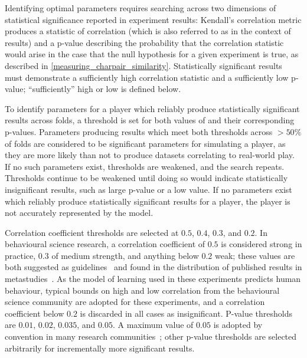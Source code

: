 Identifying optimal parameters requires searching across two dimensions of
statistical significance reported in experiment results: Kendall's \tau{}
correlation metric produces a statistic of correlation (which is also referred
to as \tau{} in the context of results) and a p-value describing the probability
that the correlation statistic would arise in the case that the null hypothesis
for a given experiment is true, as described in
\cref{measuring_charpair_similarity}. Statistically significant results must
demonstrate a sufficiently high correlation statistic and a sufficiently low
p-value; ``sufficiently'' high or low is defined below.

To identify parameters for a player which reliably produce statistically
significant results across folds, a threshold is set for both values of \tau{}
and their corresponding p-values. Parameters producing results which meet both
thresholds across $>50\%$ of folds are considered to be significant
parameters for simulating a player, as they are more likely than not to produce
datasets correlating to real-world play. If no such parameters exist,
thresholds are weakened, and the search repeats. Thresholds continue to be
weakened until doing so would indicate statistically insignificant results, such
as large p-value or a low \tau{} value. If no parameters exist which reliably
produce statistically significant results for a player, the player is not
accurately represented by the model.

\label{statistical_significance_thresholds_justified}
Correlation coefficient thresholds are selected at $0.5$, $0.4$, $0.3$, and
$0.2$. In behavioural science research, a correlation coefficient of $0.5$ is
considered strong in practice, $0.3$ of medium strength, and anything below
$0.2$ weak; these values are both suggested as
guidelines~\cite{significant_values_for_correlation_statistics} and found in the
distribution of published results in
metastudies~\cite{interpreting_correlation_coefficient_magnitude_psychology}. As
the model of learning used in these experiments predicts human behaviour,
typical bounds on high and low correlation from the behavioural science
community are adopted for these experiments, and a correlation coefficient below
$0.2$ is discarded in all cases as insignificant. P-value thresholds are $0.01$,
$0.02$, $0.035$, and $0.05$. A maximum value of $0.05$ is adopted by convention
in many research communities~\cite{borderline-significance-statistics-medicine};
other p-value thresholds are selected arbitrarily for incrementally more significant
results.

